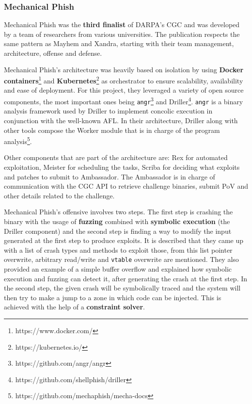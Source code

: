 \documentclass[12pt,a4paper,english,onecolumn]{IEEEtran}
\begin{document}
\subsubsection{Mechanical Phish}

Mechanical Phish \cite{mechanical_phish} was the \textbf{third finalist} of DARPA's CGC and was developed by a team of researchers from various universities. The publication respects the same pattern as Mayhem and Xandra, starting with their team management, architecture, offense and defense.

Mechanical Phish's architecture was heavily based on isolation by using \textbf{Docker containers}\footnote{https://www.docker.com/} and \textbf{Kubernetes}\footnote{https://kubernetes.io/} as orchestrator to ensure scalability, availability and ease of deployment. For this project, they leveraged a variety of open source components, the most important ones being \texttt{angr}\footnote{https://github.com/angr/angr} and Driller\footnote{https://github.com/shellphish/driller}. \texttt{angr} is a binary analysis framework used by Driller to implement concolic execution in conjunction with the well-known AFL. In their architecture, Driller along with other tools compose the Worker module that is in charge of the program analysis\footnote{https://github.com/mechaphish/mecha-docs}.

Other components that are part of the architecture are: Rex for automated exploitation, Meister for scheduling the tasks, Scriba for deciding what exploits and patches to submit to Ambassador. The Ambassador is in charge of communication with the CGC API to retrieve challenge binaries, submit PoV and other details related to the challenge.

Mechanical Phish's offensive involves two steps. The first step is crashing the binary with the usage of \textbf{fuzzing} combined with \textbf{symbolic execution} (the Driller component) and the second step is finding a way to modify the input generated at the first step to produce exploits. It is described that they came up with a list of crash types and methods to exploit those, from this list pointer overwrite, arbitrary read/write and \texttt{vtable} overwrite are mentioned. They also provided an example of a simple buffer overflow and explained how symbolic execution and fuzzing can detect it, after generating the crash at the first step. In the second step, the given crash will be symbolically traced and the system will then try to make a jump to a zone in which code can be injected. This is achieved with the help of a \textbf{constraint solver}.
\end{document}
